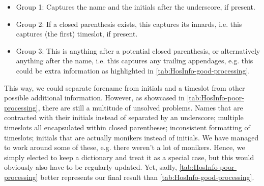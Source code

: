 \begin{itemize}
	\item Group 1: Captures the name and the initials after the underscore, if present.
	\item Group 2: If a closed parenthesis exists, this captures its innards, i.e. this captures (the first) timeslot, if present.
	\item Group 3: This is anything after a potential closed parenthesis, or alternatively anything after the name, i.e. this captures any trailing appendages, e.g. this could be extra information as highlighted in \autoref{tab:HosInfo-good-processing}.
\end{itemize}
This way, we could separate forename from initials and a timeslot from other possible additional information. However, as showcased in \autoref{tab:HosInfo-poor-processing}, there are still a multitude of unsolved problems. Names that are contracted with their initials instead of separated by an underscore; multiple timeslots all encapsulated within closed parentheses; inconsistent formatting of timeslots; initials that are actually monikers instead of initials. We have managed to work around some of these, e.g. there weren't a lot of monikers. Hence, we simply elected to keep a \gls{dictionary} and treat it as a special case, but this would obviously also have to be regularly updated. Yet, sadly, \autoref{tab:HosInfo-poor-processing} better represents our final result than \autoref{tab:HosInfo-good-processing}.

